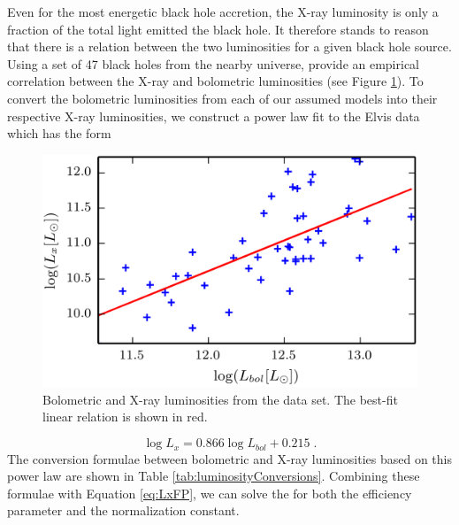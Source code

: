 Even for the most energetic black hole accretion, the X-ray luminosity
is only a fraction of the total light emitted the black hole. It therefore
stands to reason that there is a relation between the two luminosities
for a given black hole source. Using a set of 47 black holes from
the nearby universe, \citet{elvis1994atlasof} provide an empirical
correlation between the X-ray and bolometric luminosities (see Figure
\ref{fig:Elvis_template}). To convert the bolometric luminosities
from each of our assumed models into their respective X-ray luminosities,
we construct a power law fit to the Elvis data which has the form
\begin{figure}
\centering{}\includegraphics[clip]{Figures/elvis_template}\protect\caption{\label{fig:Elvis_template}Bolometric and X-ray luminosities from
the \citet{elvis1994atlasof} data set. The best-fit linear relation
is shown in red.}
\end{figure}


\begin{equation}
\log L_{x}=0.866\log L_{bol}+0.215\;.
\end{equation}
The conversion formulae between bolometric and X-ray luminosities
based on this power law are shown in Table \ref{tab:luminosityConversions}.
Combining these formulae with Equation \ref{eq:LxFP}, we can solve
the for both the efficiency parameter and the normalization constant.

